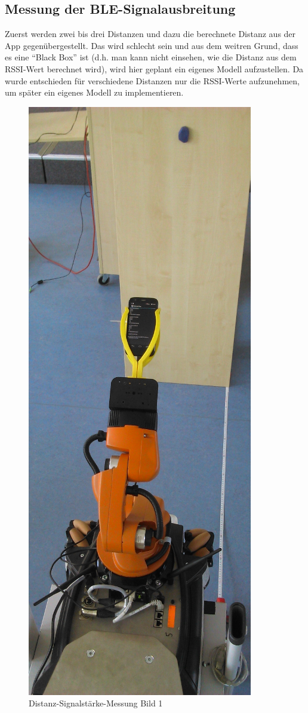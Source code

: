 \subsection{Messung der BLE-Signalausbreitung}
Zuerst werden zwei bis drei Distanzen und dazu die berechnete Distanz aus der App gegenübergestellt. Das wird schlecht sein und aus dem weitren Grund, dass es eine "`Black Box"' ist (d.h. man kann nicht einsehen, wie die Distanz aus dem RSSI-Wert berechnet wird), wird hier geplant ein eigenes Modell aufzustellen. Da wurde entschieden für verschiedene Distanzen nur die RSSI-Werte aufzunehmen, um später ein eigenes Modell zu implementieren.
\begin{figure}[H] 
\centering
\includegraphics[scale=0.3]{Bilder/MessungDistanz1}
\caption{Distanz-Signalstärke-Messung Bild 1}
\end{figure}
